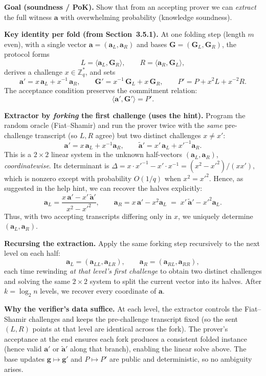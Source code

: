 \documentclass[11pt,a4paper]{article}
\begin{document}
\medskip
\textbf{Goal (soundness / PoK).} Show that from an accepting prover we can \emph{extract} the full witness $\mathbf{a}$ with overwhelming probability (knowledge soundness). 

\medskip
\textbf{Key identity per fold (from Section~3.5.1).} 
At one folding step (length $m$ even), with a single vector $\mathbf{a}=(\mathbf{a}_L,\mathbf{a}_R)$ and bases $\mathbf{G}=(\mathbf{G}_L,\mathbf{G}_R)$, the protocol forms
\[
L=\langle \mathbf{a}_L,\mathbf{G}_R\rangle,\qquad
R=\langle \mathbf{a}_R,\mathbf{G}_L\rangle,
\]
derives a challenge $x\in\mathbb{Z}_q^\ast$, and sets
\[
\mathbf{a}' = x\,\mathbf{a}_L + x^{-1}\,\mathbf{a}_R,\qquad
\mathbf{G}' = x^{-1}\,\mathbf{G}_L + x\,\mathbf{G}_R,\qquad
P' = P + x^{2}L + x^{-2}R.
\]
The acceptance condition preserves the commitment relation:
\[
\langle \mathbf{a}',\mathbf{G}'\rangle = P'.
\]

\medskip
\textbf{Extractor by \emph{forking} the first challenge (uses the hint).}
Program the random oracle (Fiat--Shamir) and run the prover twice with the \emph{same} pre-challenge transcript (so $L,R$ agree) but two distinct challenges $x\neq x'$:
\[
\mathbf{a}' = x\,\mathbf{a}_L + x^{-1}\mathbf{a}_R,\qquad
\widetilde{\mathbf{a}}' = x'\,\mathbf{a}_L + {x'}^{-1}\mathbf{a}_R.
\]
This is a $2\times 2$ linear system in the unknown half-vectors $(\mathbf{a}_L,\mathbf{a}_R)$, \emph{coordinatewise}. Its determinant is
\(
\Delta = x\cdot {x'}^{-1} - x'\cdot x^{-1} = (x^2 - {x'}^2)/(x x'),
\)
which is nonzero except with probability $O(1/q)$ when $x^2={x'}^2$.
Hence, as suggested in the help hint, we can recover the halves explicitly:
\[
\mathbf{a}_L = \frac{x\,\mathbf{a}' - x'\,\widetilde{\mathbf{a}}'}{\,x^2 - {x'}^2\,},\qquad
\mathbf{a}_R = x\,\mathbf{a}' - x^2 \mathbf{a}_L
             \;=\; x'\,\widetilde{\mathbf{a}}' - {x'}^{2}\mathbf{a}_L.
\]
Thus, with two accepting transcripts differing only in $x$, we uniquely determine $(\mathbf{a}_L,\mathbf{a}_R)$.

\medskip
\textbf{Recursing the extraction.}
Apply the same forking step recursively to the next level on each half:
\[
\mathbf{a}_L = (\mathbf{a}_{LL},\mathbf{a}_{LR}),\qquad
\mathbf{a}_R = (\mathbf{a}_{RL},\mathbf{a}_{RR}),
\]
each time rewinding \emph{at that level’s first challenge} to obtain two distinct challenges and solving the same $2\times 2$ system to split the current vector into its halves. After $k=\log_2 n$ levels, we recover every coordinate of $\mathbf{a}$.

\medskip
\textbf{Why the verifier’s data suffice.}
At each level, the extractor controls the Fiat--Shamir challenges and keeps the pre-challenge transcript fixed (so the sent $(L,R)$ points at that level are identical across the fork). The prover’s acceptance at the end ensures each fork produces a consistent folded instance (hence valid $\mathbf{a}'$ or $\widetilde{\mathbf{a}}'$ along that branch), enabling the linear solve above. The base updates $\mathbf{g}\mapsto\mathbf{g}'$ and $P\mapsto P'$ are public and deterministic, so no ambiguity arises.
\end{document}
